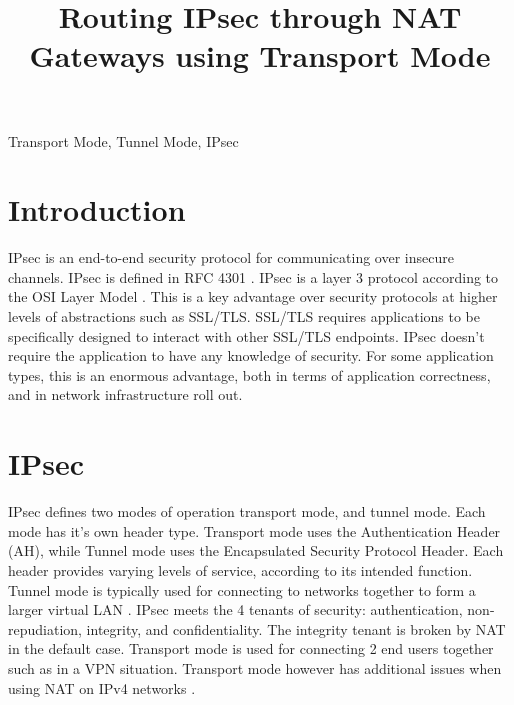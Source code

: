 \documentclass[conference,12pt]{IEEEtran}
\begin{document}
%
\title{Routing IPsec through NAT Gateways using Transport Mode}

\author{
}
\maketitle


\begin{abstract}
\end{abstract}

\begin{IEEEkeywords}
    Transport Mode, Tunnel Mode, IPsec
\end{IEEEkeywords}

\section{Introduction}
IPsec is an end-to-end security protocol for communicating over insecure
channels. IPsec is defined in RFC 4301 \autocite{rfc4301}.  IPsec is a layer
3 protocol according to the OSI Layer Model \autocite{_osi_2014}.  This
  is a key advantage over security protocols at higher levels of abstractions
  such as SSL/TLS.  SSL/TLS requires applications to be specifically designed to
  interact with other SSL/TLS endpoints. IPsec doesn't require the application
  to have any knowledge of security. For some application types, this is an
  enormous advantage, both in terms of application correctness, and in network
  infrastructure roll out. 

\section{IPsec}

IPsec defines two modes of operation transport mode, and tunnel mode. Each mode
has it's own header type. Transport mode uses the Authentication Header (AH), while
Tunnel mode uses the Encapsulated Security Protocol Header. Each header provides varying
levels of service, according to its intended function. Tunnel mode is typically
used for connecting to networks together to form a larger virtual LAN
\autocite{cisco_ipsec}. IPsec meets the 4 tenants of security:
authentication, non-repudiation, integrity, and confidentiality. The integrity
tenant is broken by NAT in the default case. Transport mode is used for connecting 2 end users
together such as in a VPN situation. Transport mode however has additional
issues when using NAT on IPv4 networks \autocite{rfc3022}.
\end{document}
